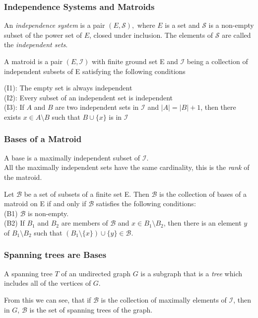 \documentclass{beamer}
\begin{document}
\begin{frame}
\frametitle{Independence Systems and Matroids}
\begin{definition}
An \textit{independence system} is a pair $(E,\mathcal{S}),$ where $E$ is a set and $\mathcal{S}$ is a non-empty subset of the power set of $E$, closed under inclusion. The elements of $\mathcal{S}$ are called the \textit{independent sets}.
\end{definition}
\begin{definition}
A matroid is a pair $(E,\mathcal{I})$ with finite ground set E and $\mathcal{I}$ being a collection of independent subsets of E satisfying the following conditions

\vspace{2mm}

 \noindent (I1): The empty set is always independent\\
 \noindent (I2): Every subset of an independent set is independent\\
 \noindent (I3): If $ A $ and $ B $ are two independent sets in $\mathcal{I}$ and $|A|=|B|+1$, then there exists $ x \in A \setminus B $ such that $ B \cup \{ x \} $ is in $\mathcal{I}$
\end{definition}

\end{frame}

\begin{frame}
\frametitle{Bases of a Matroid}
 
\begin{definition}
A base is a maximally independent subset of $\mathcal{I}.$\\
\noindent All the maximally independent sets have the same cardinality, this is the \textit{rank} of the matroid.
\end{definition}
\begin{definition}
  Let $\mathcal{B}$ be a set of subsets of a finite set E. Then $\mathcal{B}$ is the collection of bases of a matroid on E if and only if $\mathcal{B}$ satisfies the following conditions:\\
 (B1) $\mathcal{B}$ is non-empty.\\
 (B2) If $B_1$ and $B_2$ are members of $\mathcal{B}$ and $x \in B_1 \setminus B_2$, then there is an element $y$ of $B_1 \setminus B_2$ such that $(B_1 \setminus \{x\}) \cup \{y\} \in \mathcal{B}$.
 \end{definition}
\end{frame}

\begin{frame}
\frametitle{Spanning trees are Bases}
\begin{definition}
A spanning tree $T$ of an undirected graph $G$ is a subgraph that is a \textit{tree} which includes all of the vertices of $G.$

\end{definition}

\vspace{4mm}

From this we can see, that if $\mathcal{B}$ is the collection of maximally elements of $\mathcal{I}$, then in $G$, $\mathcal{B}$ is the set of spanning trees of the graph.
\end{frame}
\end{document}
